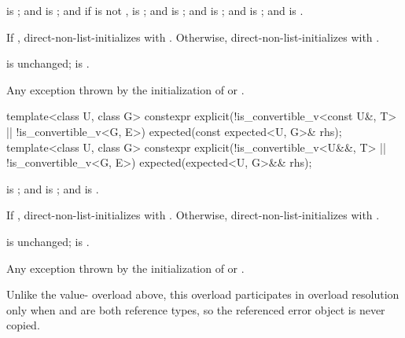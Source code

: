 \begin{itemdescr}
\pnum
\constraints
{} is ; and  is ; and if  is not ,  is ; and  is ; and  is ; and  is ; and  is .

\pnum
\effects
If , direct-non-list-initializes  with . Otherwise, direct-non-list-initializes  with .

\pnum
\ensures
{} is unchanged;  is .

\pnum
\throws
Any exception thrown by the initialization of  or .
\end{itemdescr}

%
\begin{itemdecl}
template<class U, class G>
constexpr explicit(!is_convertible_v<const U&, T> || !is_convertible_v<G, E>)
    expected(const expected<U, G>& rhs);
template<class U, class G>
constexpr explicit(!is_convertible_v<U&&, T> || !is_convertible_v<G, E>)
    expected(expected<U, G>&& rhs);
\end{itemdecl}

\begin{itemdescr}
\pnum
\constraints
{} is ; and  is ; and  is .

\pnum
\effects
If , direct-non-list-initializes  with . Otherwise, direct-non-list-initializes  with .

\pnum
\ensures
{} is unchanged;  is .

\pnum
\throws
Any exception thrown by the initialization of  or .

\pnum
\remarks
Unlike the value- overload above, this overload participates in overload resolution only when  and  are both reference types, so the referenced error object is never copied.
\end{itemdescr}

